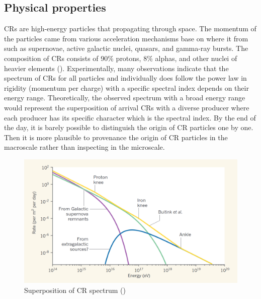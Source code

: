 \subsection{Physical properties}
CRs are high-energy particles that propagating through
space. The momentum of the particles came from
various acceleration mechanisms base on where it from such as supernovae, active galactic nuclei, quasars, and gamma-ray bursts. The composition of CRs consists of
90\% protons, 8\% alphas, and other nuclei of heavier
elements (\cite{CRComposition2017}). Experimentally,
many observations indicate that the spectrum of CRs for all particles and individually does follow the power law in rigidity (momentum per charge) with a specific spectral index depends on their energy range. Theoretically, the observed spectrum
with a broad energy range would represent the superposition
of arrival CRs with a diverse producer where each producer
has its specific character which is the spectral index.
By the end of the day, it is barely possible to distinguish
the origin of CR particles one by one. Then it is more plausible to provenance the origin of CR particles in the macroscale rather than inspecting in the microscale.




\begin{figure}[h!]
    \centering
    \includegraphics[width=\textwidth]{content/background/figures/andrew_superposition.png}
    \caption{Superposition of CR spectrum (\cite{taylor2016_crspectrumsuperposition})}
    \label{fig:cr_superposition}
\end{figure}

